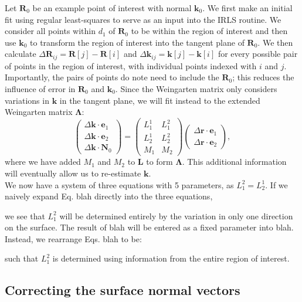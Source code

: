 Let $\mathbf{R}_0$ be an example point of interest with normal $\mathbf{k}_0$.
We first make an initial fit using regular least-squares to serve as an input into the IRLS routine.
We consider all points within $d_1$ of $\mathbf{R}_0$ to be within the region of interest and then use $\mathbf{k}_0$ to transform the region of interest into the tangent plane of $\mathbf{R}_0$.
We then calculate $\Delta \mathbf{R}_{ij} = \mathbf{R}[j]-\mathbf{R}[i]$ and $\Delta \mathbf{k}_{ij} = \mathbf{k}[j]-\mathbf{k}[i]$ for every possible pair of points in the region of interest, with individual points indexed with $i$ and $j$.
Importantly, the pairs of points do note need to include the $\mathbf{R}_0$; this reduces the influence of error in $\mathbf{R}_0$ and $\mathbf{k}_0$.
Since the Weingarten matrix only considers variations in $\mathbf{k}$ in the tangent plane, we will fit instead to the extended Weingarten matrix $\bm{\Lambda}$:
\begin{equation}
\begin{pmatrix}
\Delta \bm{k} \cdot \bm{e}_1 \\
\Delta \bm{k} \cdot \bm{e}_2 \\
\Delta \bm{k} \cdot \bm{N}_0
\end{pmatrix}
=
\begin{pmatrix}
L^1_1 & L^2_1 \\
L^1_2 & L^2_2 \\
M_{1} & M_{2}
\end{pmatrix}
\begin{pmatrix}
\Delta \bm{r} \cdot \bm{e}_1 \\
\Delta \bm{r} \cdot \bm{e}_2
\end{pmatrix},
\label{e:fit2}
\end{equation}
where we have added $M_1$ and $M_2$ to $\mathbf{L}$ to form $\bm{\Lambda}$.
This additional information will eventually allow us to re-estimate $\mathbf{k}$. \\

We now have a system of three equations with 5 parameters, as $L^2_1 = L^1_2$.
If we naively expand Eq. blah directly into the three equations,

we see that $L^2_1$ will be determined entirely by the variation in only one direction on the surface.
The result of blah will be entered as a fixed parameter into blah.
Instead, we rearrange Eqs. blah to be:

such that $L^2_1$ is determined using information from the entire region of interest.
\subsection{Correcting the surface normal vectors}
